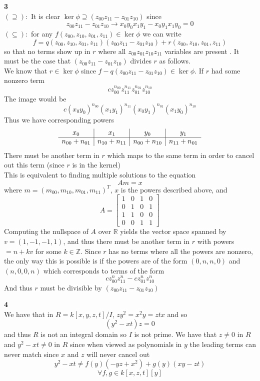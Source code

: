 \documentclass[12pt]{article}
\newenvironment{ques}[1]{\textbf{#1}\vspace{1 mm}\\ }{\bigskip}
\theoremstyle{definition}
\newcommand{\R}{\mathbb R}
\newcommand{\Z}{\mathbb Z}
\begin{document}
\begin{ques}{3}
	$(\supseteq):$ It is clear $\ker \phi \supseteq (z_{00}z_{11} - z_{01}z_{10})$ since 
	$$z_{00}z_{11} - z_{01}z_{10} \to x_0y_0x_1y_1 - x_0y_1x_1y_0 = 0$$
	$(\subseteq):$ for any $f(z_{00}, z_{10},z_{01},z_{11}) \in \ker \phi$ we can write
	$$f = q(z_{00}, z_{10},z_{01},z_{11})(z_{00}z_{11} - z_{01}z_{10}) +
	r(z_{00},z_{10},z_{01},z_{11})$$
	so that no terms show up in $r$ where all $z_{00}z_{01}z_{10}z_{11}$
	variables are present . It must be the case that $(z_{00}z_{11} -
	z_{01}z_{10})$ divides $r$ as follows.\\
	We know that $r \in \ker \phi$ since $f - q(z_{00}z_{11} - z_{01}z_{10})
	\in \ker \phi$. If $r$ had some nonzero term
	$$cz_{00}^{n_{00}}z_{11}^{n_{11}}z_{01}^{n_{01}}z_{10}^{n_{10}}$$
	The image would be 
	$$c(x_0y_0)^{n_{00}}(x_1y_1)^{n_{11}}(x_0y_1)^{n_{01}}(x_1y_0)^{n_{10}}$$
	Thus we have corresponding powers
	$$\begin{array}{c| c| c| c}
	x_0 & x_1 & y_0 & y_1\\
	\hline
	n_{00} + n_{01} & n_{10} + n_{11} & n_{00} + n_{10} & n_{11} + n_{01}
	\end{array}$$
	There must be another term in $r$ which maps to the same term in order to
	cancel out this term (since $r$ is in the kernel)\\
	This is equivalent to finding multiple solutions to the equation
	$$Am = x$$
	where $m = (m_{00}, m_{10}, m_{01}, m_{11})^T$, $x$ is the powers described
	above, and
	$$A = \begin{bmatrix}
	1 & 0 & 1 & 0\\
	0 & 1 & 0 & 1\\
	1 & 1 & 0 & 0\\
	0 & 0 & 1 & 1
	\end{bmatrix}$$
	Computing the nullspace of $A$ over $\R$ yields the vector space spanned by
	$v = (1,-1,-1,1)$, and thus there must be another term in $r$ with powers
	$= n + kv$ for some $k \in \Z$. Since $r$ has no terms where all the powers
	are nonzero, the only way this is possible is if the powers are of the form
	$(0, n, n, 0)$ and $(n, 0, 0, n)$ which corresponds to terms of the form
	$$cz_{00}^nz_{11}^n - cz_{01}^nz_{10}^n$$
	And thus $r$ must be divisible by $(z_{00}z_{11} -
	z_{01}z_{10})$
\end{ques}

\begin{ques}{4}
	We have that in $R = k[x,y,z,t]/I$, $zy^2 = x^2y = ztx$ and so
	$$(y^2 - xt)z = 0$$
	and thus $R$ is not an integral domain so $I$ is not prime. We have that $z
	\neq 0$ in $R$ and $y^2 - xt \neq 0$ in $R$ since when viewed as
	polynomials in $y$ the leading terms can never match since $x$ and $z$ will
	never cancel out
	$$y^2 - xt \neq f(y)(-yz + x^2) + g(y)(xy - zt)$$
	$$\forall f,g \in k[x,z,t][y]$$
\end{ques}
\end{document}
